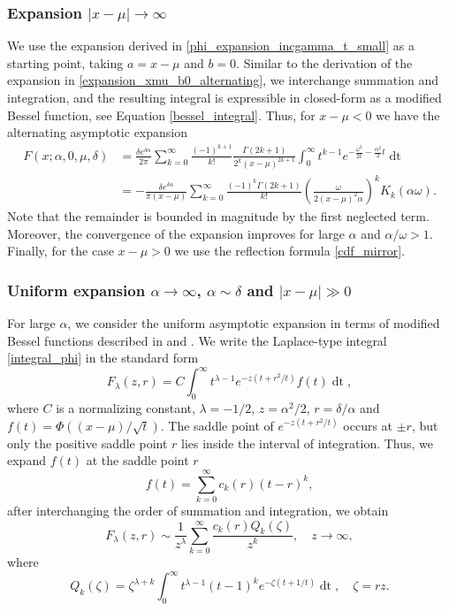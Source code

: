\documentclass[10pt,a4paper,oneside]{article}
\numberwithin{equation}{section}
\begin{document}
\subsubsection{Expansion $|x-\mu| \to \infty$}
We use the expansion derived in \eqref{phi_expansion_incgamma_t_small} as a starting point, taking $a = x-\mu$ and $b = 0$. Similar to the derivation of the expansion in \eqref{expansion_xmu_b0_alternating}, we interchange summation and integration, and the resulting integral is expressible in closed-form as a modified Bessel function, see Equation \eqref{bessel_integral}. Thus, for $x - \mu < 0$ we have the alternating asymptotic expansion
\begin{align}\label{asymptotic_expansion_xmu_b0}
F(x; \alpha, 0, \mu, \delta) &= \frac{\delta e^{\delta \alpha}}{2\pi} \sum_{k=0}^{\infty} \frac{(-1)^{k+1}}{k!} \frac{\Gamma(2k + 1)}{2^k (x-\mu)^{2k + 1}} \int_0^{\infty} t^{k-1} e^{-\frac{\omega^2}{2t} - \frac{\alpha^2}{2}t} \mathop{dt} \nonumber \\
&= -\frac{\delta e^{\delta \alpha}}{\pi (x-\mu)} \sum_{k=0}^{\infty}\frac{(-1)^k\Gamma(2k + 1)}{k!} \left(\frac{\omega}{2(x-\mu)^2\alpha}\right)^k K_k(\alpha \omega).
\end{align}
Note that the remainder is bounded in magnitude by the first neglected term. Moreover, the convergence of the expansion improves for large $\alpha$ and $\alpha / \omega > 1$. Finally, for the case $x - \mu > 0$ we use the reflection formula \eqref{cdf_mirror}.

\subsubsection{Uniform expansion $\alpha \to \infty$, $\alpha \sim \delta$ and $|x-\mu| \gg 0$}\label{uniform_expansion_alpha_large}
For large $\alpha$, we consider the uniform asymptotic expansion in terms of modified Bessel functions described in \cite{Temme1990c} and \cite[\S 27]{Temme2015}. We write the Laplace-type integral \eqref{integral_phi} in the standard form
\begin{equation*}
F_{\lambda}(z, r) = C\int_0^{\infty} t^{\lambda - 1} e^{-z\left(t + r^2/t\right)} f(t) \mathop{dt},
\end{equation*}
where $C$ is a normalizing constant, $\lambda=-1/2$, $z = \alpha^2/2$, $r=\delta/\alpha$ and $f(t) = \Phi((x-\mu)/\sqrt{t})$. The saddle point of $e^{-z\left(t + r^2/t\right)}$ occurs at $\pm r$, but only the positive saddle point $r$ lies inside the interval of integration. Thus, we expand $f(t)$ at the saddle point $r$
\begin{equation*}
f(t) = \sum_{k=0}^{\infty} c_k(r)(t-r)^k,
\end{equation*}
after interchanging the order of summation and integration, we obtain 
\begin{equation}
F_{\lambda}(z, r) \sim \frac{1}{z^{\lambda}} \sum_{k=0}^{\infty} \frac{c_k(r) Q_k(\zeta)}{z^k}, \quad z \to \infty,
\end{equation}
where
\begin{equation*}
Q_k(\zeta) = \zeta^{\lambda + k}\int_0^{\infty} t^{\lambda - 1}(t-1)^k e^{-\zeta(t + 1/t)} \mathop{dt}, \quad \zeta = rz.
\end{equation*}
\end{document}
